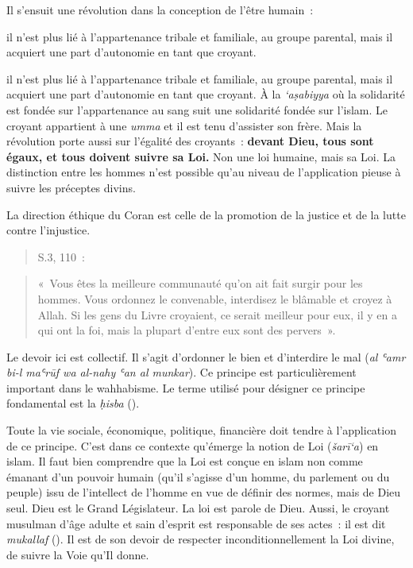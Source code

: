 Il s'ensuit une révolution dans la conception de l'être humain~:
\begin{Synthesis}
il
n'est plus lié à l'appartenance tribale et familiale, au groupe
parental, mais il acquiert une part d'autonomie en tant que croyant.
\end{Synthesis}
il
n'est plus lié à l'appartenance tribale et familiale, au groupe
parental, mais il acquiert une part d'autonomie en tant que croyant. À
la \emph{`aṣabiyya} où la solidarité est fondée sur l'appartenance au
sang suit une solidarité fondée sur l'islam. Le croyant appartient à une
\emph{umma} et il est tenu d'assister son frère. Mais la révolution
porte aussi sur l'égalité des croyants~: \textbf{devant Dieu, tous sont
égaux, et tous doivent suivre sa Loi.} Non une loi humaine, mais sa Loi.
La distinction entre les hommes n'est possible qu'au niveau de
l'application pieuse à suivre les préceptes divins.

La direction éthique du Coran est celle de la promotion de la justice et
de la lutte contre l'injustice.
\begin{quote}
S.3, 110~:

\end{quote}
\begin{quote}
«~Vous êtes la meilleure communauté qu'on ait fait surgir pour les
hommes. Vous ordonnez le convenable, interdisez le blâmable et croyez à
Allah. Si les gens du Livre croyaient, ce serait meilleur pour eux, il y
en a qui ont la foi, mais la plupart d'entre eux sont des pervers~».
\end{quote}

\begin{Def}
Le devoir ici est collectif. Il s'agit d'ordonner le bien et d'interdire
le mal (\emph{al ʿamr bi-l maʿrūf wa al-nahy ʿan al munkar}). Ce
principe est particulièrement important dans le wahhabisme. Le terme
utilisé pour désigner ce principe fondamental est la \emph{ḥisba}
(). 
\end{Def}
Toute la vie sociale, économique, politique, financière
doit tendre à l'application de ce principe. C'est dans ce contexte
qu'émerge la notion de Loi (\emph{šarī`a}) en islam. Il faut bien
comprendre que la Loi est conçue en islam non comme émanant d'un pouvoir
humain (qu'il s'agisse d'un homme, du parlement ou du peuple) issu de
l'intellect de l'homme en vue de définir des normes, mais de Dieu seul.
Dieu est le Grand Législateur. La loi est parole de Dieu. Aussi, le
croyant musulman d'âge adulte et sain d'esprit est responsable de ses
actes~: il est dit \emph{mukallaf} (). Il est de son devoir
de respecter inconditionnellement la Loi divine, de suivre la Voie qu'Il
donne.

